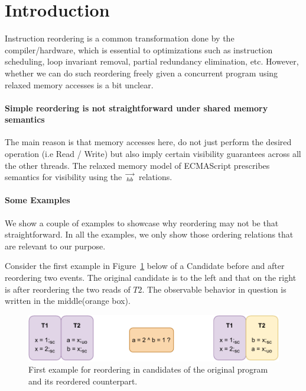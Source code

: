 
\section{Introduction}
    Instruction reordering is a common transformation done by the compiler/hardware, which is essential to optimizations such as instruction scheduling, loop invariant removal, partial redundancy elimination, etc. 
    However, whether we can do such reordering freely given a concurrent program using relaxed memory accesses is a bit unclear. 
     
    \paragraph{Simple reordering is not straightforward under shared memory semantics}
    The main reason is that memory accesses here, do not just perform the desired operation (i.e Read / Write) but also imply certain visibility guarantees across all the other threads.  
    The relaxed memory model of ECMAScript prescribes semantics for visibility using the $\stackrel{\longrightarrow}{_{hb}}$ relations. 
    
    \paragraph{Some Examples}
        We show a couple of examples to showcase why reordering may not be that straightforward. 
        In all the examples, we only show those ordering relations that are relevant to our purpose. 

        Consider the first example in Figure~\ref{reord:example1(a)} below of a Candidate before and after reordering two events.
        The original candidate is to the left and that on the right is after reordering the two reads of $T2$.
        The observable behavior in question is written in the middle(orange box). 
        \begin{figure}[H]
            \centering
            \includegraphics[scale=0.7]{4.InstructionReordering/0.Intro/ReorderingExample1(a).pdf}
            \caption{First example for reordering in candidates of the original program and its reordered counterpart.}
            \label{reord:example1(a)} 
        \end{figure}
        
